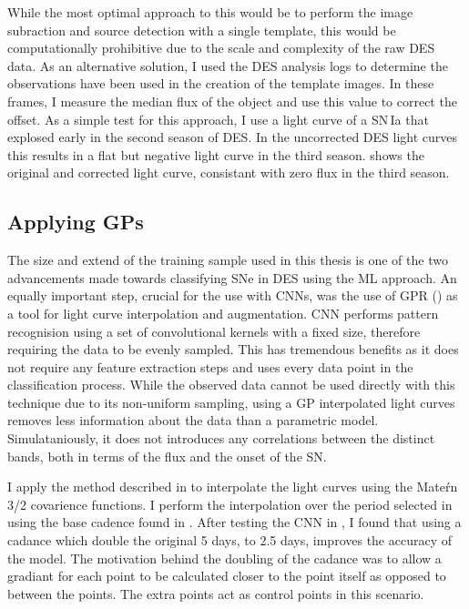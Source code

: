 While the most optimal approach to this would be to perform the image subraction and source detection with a single template, this would be computationally prohibitive due to the scale and complexity of the raw DES data. As an alternative solution, I used the DES analysis logs to determine the observations have been used in the creation of the template images. In these frames, I measure the median flux of the object and use this value to correct the offset. As a simple test for this approach, I use a light curve of a SN\,Ia that explosed early in the second season of DES. In the uncorrected DES light curves this results in a flat but negative light curve in the third season.  shows the original and corrected light curve, consistant with zero flux in the third season.

\begin{figure}
  \caption{}
  \label{fig:FluxOffset}
\end{figure}

\subsection{Applying GPs} \label{sec:UseGP}
The size and extend of the training sample used in this thesis is one of the two advancements made towards classifying SNe in DES using the ML approach. An equally important step, crucial for the use with CNNs, was the use of GPR () as a tool for light curve interpolation and augmentation. CNN performs pattern recognision using a set of convolutional kernels with a fixed size, therefore requiring the data to be evenly sampled. This has tremendous benefits as it does not require any feature extraction steps and uses every data point in the classification process. While the observed data cannot be used directly with this technique due to its non-uniform sampling, using a GP interpolated light curves removes less information about the data than a parametric model. Simulataniously, it does not introduces any correlations between the distinct bands, both in terms of the flux and the onset of the SN.

I apply the method described in  to interpolate the light curves using the Mate\'rn 3/2 covarience functions. I perform the interpolation over the period selected in  using the base cadence found in . After testing the CNN in , I found that using a cadance which double the original 5 days, to 2.5 days, improves the accuracy of the model. The motivation behind the doubling of the cadance was to allow a gradiant for each point to be calculated closer to the point itself as opposed to between the points. The extra points act as control points in this scenario.

